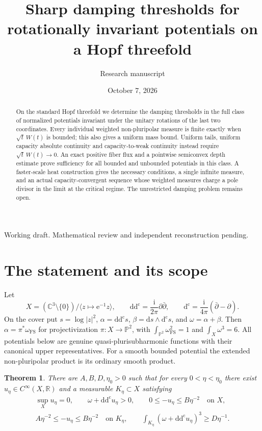 \documentclass[11pt]{article}
\title{Sharp damping thresholds for rotationally invariant\newline
potentials on a Hopf threefold}
\author{Research manuscript}
\date{October 7, 2026}
\newtheorem{theorem}{Theorem}
\theoremstyle{remark}
\newcommand{\ddc}{\mathrm{d}\mathrm{d}^{\mathrm c}}
\newcommand{\dc}{\mathrm{d}^{\mathrm c}}
\newcommand{\C}{\mathbb C}
\newcommand{\R}{\mathbb R}
\newcommand{\Pp}{\mathbb P}
\newcommand{\FS}{\mathrm{FS}}
\begin{document}
\maketitle
\begin{center}
\small Working draft. Mathematical review and independent reconstruction pending.
\end{center}
\begin{abstract}
On the standard Hopf threefold we determine the damping thresholds in the
full class of normalized potentials invariant under the unitary rotations
of the last two coordinates. Every individual weighted non-pluripolar
measure is finite exactly when $\sqrt t\,W(t)$ is bounded; this also gives
a uniform mass bound. Uniform tails, uniform capacity absolute continuity
and capacity-to-weak continuity instead require $\sqrt t\,W(t)\to0$.
An exact positive fiber flux and a pointwise semiconvex depth estimate prove
sufficiency for all bounded and unbounded potentials in this class. A
faster-scale heat construction gives the necessary conditions, a single
infinite measure, and an actual capacity-convergent sequence whose weighted
measures charge a pole divisor in the limit at the critical regime.
The unrestricted damping problem remains open.
\end{abstract}

\section{The statement and its scope}
Let
\[
 X=(\C^3\setminus\{0\})/\langle z\mapsto \mathrm e^{-1}z\rangle,
 \qquad \ddc=\frac{\mathrm i}{2\pi}\partial\bar\partial,
 \qquad \dc=\frac{\mathrm i}{4\pi}(\bar\partial-\partial).
\]
On the cover put $s=\log|z|^2$, $\alpha=\ddc s$,
$\beta=\mathrm ds\wedge\dc s$, and $\omega=\alpha+\beta$.
Then $\alpha=\pi^*\omega_{\FS}$ for projectivization
$\pi:X\to\Pp^2$, with $\int_{\Pp^2}\omega_{\FS}^2=1$ and
$\int_X\omega^3=6$. All potentials below are genuine quasi-plurisubharmonic
functions with their canonical upper representatives. For a smooth bounded
potential the extended non-pluripolar product is its ordinary smooth product.

\begin{theorem}\label{thm:core}
There are $A,B,D,\eta_0>0$ such that for every $0<\eta<\eta_0$ there exist
$u_\eta\in C^\infty(X,\R)$ and a measurable $K_\eta\subset X$ satisfying
\begin{gather*}
 \sup_Xu_\eta=0,\qquad \omega+\ddc u_\eta>0,
 \qquad 0\leq-u_\eta\leq B\eta^{-2}\quad\text{on }X,\\
 A\eta^{-2}\leq-u_\eta\leq B\eta^{-2}\quad\text{on }K_\eta,
 \qquad
 \int_{K_\eta}(\omega+\ddc u_\eta)^3\geq D\eta^{-1}.
\end{gather*}
\end{theorem}
\end{document}
